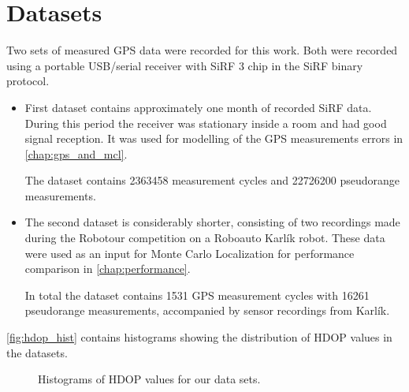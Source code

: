 \chapter{Datasets}
\label{chap:datasets}

Two sets of measured GPS data were recorded for this work.
Both were recorded using a portable USB/serial receiver with SiRF 3 chip
in the SiRF binary protocol.

\begin{itemize}

\item
First dataset contains approximately one month of recorded SiRF data.
During this period the receiver was stationary inside a room and had good signal 
reception. 
It was used for modelling of the GPS measurements errors in \autoref{chap:gps_and_mcl}.

The dataset contains \num{2363458} measurement cycles and
\num{22726200} pseudorange measurements.

\item
The second dataset is considerably shorter, consisting of two recordings made during
the Robotour competition \cite{robotour} on a Roboauto Karlík \cite{karlik} robot.
These data were used as an input for Monte Carlo Localization for performance comparison in \autoref{chap:performance}.

In total the dataset contains \num{1531} GPS measurement cycles with
\num{16261} pseudorange measurements, accompanied by sensor recordings from Karlík.
\end{itemize}

\autoref{fig:hdop_hist} contains histograms showing the distribution of HDOP values in the datasets.

\begin{figure}[htp]
	\centering
	\noindent{}
	\caption{Histograms of HDOP values for our data sets.}
	\label{fig:hdop_hist}

\end{figure}


